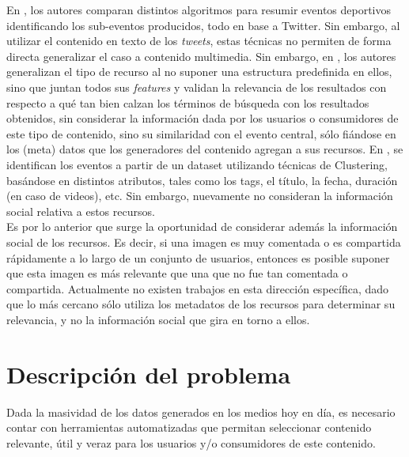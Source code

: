 \documentclass[11pt]{article}
\begin{document}
  En \cite{events}, los autores comparan distintos algoritmos para resumir eventos deportivos identificando los sub-eventos producidos, todo en base a Twitter. Sin embargo, al utilizar el contenido en texto de los \emph{tweets}, estas técnicas no permiten de forma directa generalizar el caso a contenido multimedia. Sin embargo, en \cite{concerts}, los autores generalizan el tipo de recurso al no suponer una estructura predefinida en ellos, sino que juntan todos sus \emph{features} y validan la relevancia de los resultados con respecto a qué tan bien calzan los términos de búsqueda con los resultados obtenidos, sin considerar la información dada por los usuarios o consumidores de este tipo de contenido, sino su similaridad con el evento central, sólo fiándose en los (meta) datos que los generadores del contenido agregan a sus recursos. En \cite{clusterers}, se identifican los eventos a partir de un dataset utilizando técnicas de Clustering, basándose en distintos atributos, tales como los tags, el título, la fecha, duración (en caso de videos), etc. Sin embargo, nuevamente no consideran la información social relativa a estos recursos.\\

  Es por lo anterior que surge la oportunidad de considerar además la información social de los recursos. Es decir, si una imagen es muy comentada o es compartida rápidamente a lo largo de un conjunto de usuarios, entonces es posible suponer que esta imagen es más relevante que una que no fue tan comentada o compartida. Actualmente no existen trabajos en esta dirección específica, dado que lo más cercano sólo utiliza los metadatos de los recursos para determinar su relevancia, y no la información social que gira en torno a ellos.

\newpage
\section{Descripción del problema}
\label{sec-2}


  Dada la masividad de los datos generados en los medios hoy en día,
  es necesario contar con herramientas automatizadas que permitan
  seleccionar contenido relevante, útil y veraz para los usuarios y/o
  consumidores de este contenido.\\
\end{document}
